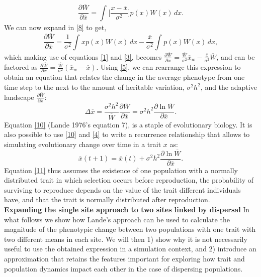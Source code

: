 \documentclass{revtex4}
\begin{document}
\begin{equation}\label{8}
\frac{\partial \overline{W}}{\partial \overline{x}}=\int_{} \Big[\frac{x-\overline{x}}{\sigma^{2}}\Big] p(x)W(x)\,dx.
\end{equation}
We can now expand in \ref{8} to get,
\begin{equation}\label{9}
\frac{\partial \overline{W}}{\partial \overline{x}}=
\frac{1}{\sigma^{2}}\int_{}xp(x)W(x)\,dx-\frac{\overline{x}}{\sigma^{2}}\int_{}p(x)W(x)\,dx,
\end{equation}
which making use of equations \ref{1} and \ref{3}, becomes $\frac{\partial \overline{W}}{\partial \overline{x}}=
\frac{\overline{W}}{\sigma^{2}}\overline{x}_{w}-\frac{\overline{x}}{\sigma^{2}}\overline{W}$, and can be factored as $\frac{\partial \overline{W}}{\partial \overline{x}}=
\frac{\overline{W}}{\sigma^{2}}(\overline{x}_{w}-\overline{x})$. Using \ref{5}, we can rearrange this expression to obtain an equation that relates the change in the average phenotype from one time step to the next to the amount of heritable variation, $\sigma^{2}h^{2}$, and the adaptive landscape $\frac{\partial \overline{W}}{\partial \overline{x}}$:
\begin{equation}\label{10}
\Delta \overline{x}=\frac{\sigma^{2}h^{2}}{\overline{W}}\frac{\partial \overline{W}}{\partial \overline{x}}=\sigma^{2}h^{2}\frac{\partial \ln\overline{W}}{\partial \overline{x}}.
\end{equation}
Equation \ref{10} (Lande 1976's equation 7), is a staple of evolutionary biology. It is also possible to use \ref{10} and \ref{4} to write a recurrence relationship that allows to simulating evolutionary change over time in a trait $x$ as:
\begin{equation}\label{11}
\overline{x}(t+1)=\overline{x}(t)+\sigma^{2}h^{2}\frac{\partial \ln\overline{W}}{\partial \overline{x}}.
\end{equation}
Equation \ref{11} thus assumes the existence of one population with a normally distributed trait in which selection occurs before reproduction, the probability of surviving to reproduce depends on the value of the trait different individuals have, and that the trait is normally distributed after reproduction. \\

\textbf{Expanding the single site approach to two sites linked by dispersal} In what follows we show how Lande's approach can be used to calculate the magnitude of the phenotypic change between two populations with one trait with two different means in each site.
We will then 1) show why it is not necessarily useful to use the obtained expression in a simulation context, and 2) introduce an approximation that retains the features important for exploring how trait and population dynamics impact each other in the case of dispersing populations. 
\end{document}
